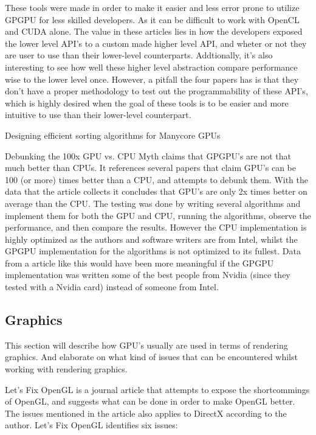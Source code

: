 These tools were made in order to make it easier and less error prone to utilize GP\gls{GPU} for less skilled developers. As it can be difficult to work with OpenCL and CUDA alone.
The value in these articles lies in how the developers exposed the lower level \gls{API}'s to a custom made higher level \gls{API}, and wheter or not they are user to use than their lower-level counterparts. Addtionally, it's also interesting to see how well these higher level abstraction compare performance wise to the lower level once. However, a pitfall the four papers has is that they don't have a proper methodology to test out the programmability of these \gls{API}'s, which is highly desired when the goal of these tools is to be easier and more intuitive to use than their lower-level counterpart.

Designing efficient sorting algorithms for Manycore \gls{GPU}s \cite{satish_2009_designing}

Debunking the 100x \gls{GPU} vs. CPU Myth \cite{lee_2010_debunking} claims that GP\gls{GPU}'s are not that much better than CPUs. 
It references several papers that claim \gls{GPU}'s can be 100 (or more) times better than a CPU, and attempts to debunk them. 
With the data that the article collects it concludes that \gls{GPU}'s are only 2x times better on average than the CPU. 
The testing was done by writing several algorithms and implement them for both the \gls{GPU} and CPU, running the algorithms, observe the performance, and then compare the results. 
However the CPU implementation is highly optimized as the authors and software writers are from Intel, whilst the GP\gls{GPU} implementation for the algorithms is not optimized to its fullest. 
Data from a article like this would have been more meaningful if the GP\gls{GPU} implementation was written some of the best people from Nvidia (since they tested with a Nvidia card) instead of someone from Intel.

\subsection{Graphics}
This section will describe how \gls{GPU}'s usually are used in terms of rendering graphics. And elaborate on what kind of issues that can be encountered whilst working with rendering graphics.

Let's Fix OpenGL \cite{fix_opengl} is a journal article that attempts to expose the shortcommings of OpenGL, and suggests what can be done in order to make OpenGL better. 
The issues mentioned in the article also applies to DirectX according to the author. 
Let's Fix OpenGL  \cite{fix_opengl} identifies six issues: 
